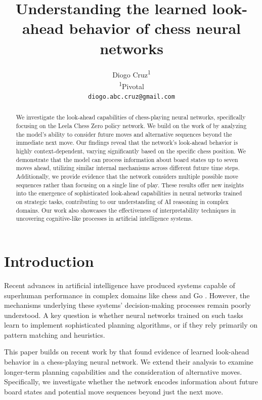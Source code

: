\documentclass{article}
\title{Understanding the learned look-ahead behavior of chess neural networks}
\author{
Diogo Cruz\textsuperscript{1}\\
\textsuperscript{1}Pivotal\\
\texttt{diogo.abc.cruz@gmail.com}
}
\begin{document}
\maketitle

\begin{abstract}
We investigate the look-ahead capabilities of chess-playing neural networks, specifically focusing on the Leela Chess Zero policy network. We build on the work of \citet{jenner2024evidence} by analyzing the model's ability to consider future moves and alternative sequences beyond the immediate next move. Our findings reveal that the network's look-ahead behavior is highly context-dependent, varying significantly based on the specific chess position. We demonstrate that the model can process information about board states up to seven moves ahead, utilizing similar internal mechanisms across different future time steps. Additionally, we provide evidence that the network considers multiple possible move sequences rather than focusing on a single line of play. These results offer new insights into the emergence of sophisticated look-ahead capabilities in neural networks trained on strategic tasks, contributing to our understanding of AI reasoning in complex domains. Our work also showcases the effectiveness of interpretability techniques in uncovering cognitive-like processes in artificial intelligence systems.
\end{abstract}

\section{Introduction}

Recent advances in artificial intelligence have produced systems capable of superhuman performance in complex domains like chess and Go \citep{AlphaZero}. However, the mechanisms underlying these systems' decision-making processes remain poorly understood. A key question is whether neural networks trained on such tasks learn to implement sophisticated planning algorithms, or if they rely primarily on pattern matching and heuristics.

This paper builds on recent work by \citet{jenner2024evidence} that found evidence of learned look-ahead behavior in a chess-playing neural network. We extend their analysis to examine longer-term planning capabilities and the consideration of alternative moves. Specifically, we investigate whether the network encodes information about future board states and potential move sequences beyond just the next move.
\end{document}
